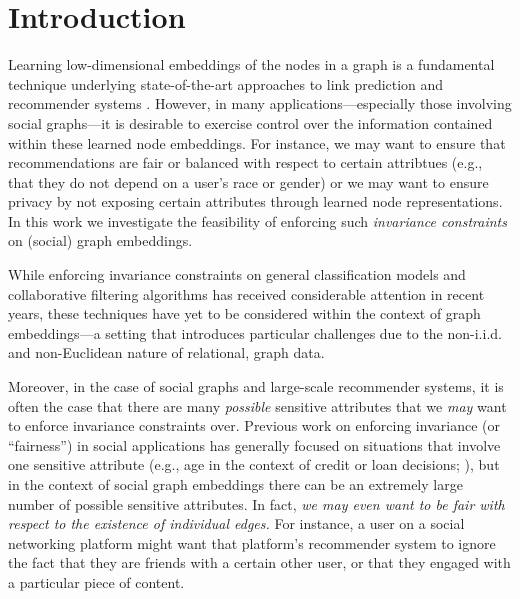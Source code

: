 \section{Introduction}
Learning low-dimensional embeddings of the nodes in a graph is a fundamental technique underlying state-of-the-art approaches to link prediction and recommender systems \cite{cai2018comprehensive,hamilton2017representation}. 
However, in many applications---especially those involving social graphs---it is desirable to exercise control over the information contained within these learned node embeddings. 
For instance, we may want to ensure that recommendations are fair or balanced with respect to certain attribtues (e.g., that they do not depend on a user's race or gender) or we may want to ensure privacy by not exposing certain attributes through learned node representations. 
In this work we investigate the feasibility of enforcing such {\em invariance constraints} on (social)  graph embeddings. 

While enforcing invariance constraints on general classification models \cite{chouldechova2017fair,gajane2017formalizing,kamishima2012fairness,madras2018learning,zemel2013learning} and collaborative filtering algorithms \cite{yao2017new} has received considerable attention in recent years, these techniques have yet to be considered within the context of graph embeddings---a setting that introduces particular challenges due to the non-i.i.d. and non-Euclidean nature of relational, graph data. 

Moreover, in the case of social graphs and large-scale recommender systems, it is often the case that there are many {\em possible} sensitive attributes that we {\em may} want to enforce invariance constraints over.
Previous work on enforcing invariance (or ``fairness'') in social applications has generally focused on situations that involve one sensitive attribute (e.g., age in the context of credit or loan decisions; \citet{zemel2013learning}), but in the context of social graph embeddings there can be an extremely large number of possible sensitive attributes. In fact, {\em we may even want to be fair with respect to the existence of individual edges.}
For instance, a user on a social networking platform might want that platform's recommender system to ignore the fact that they are friends with a certain other user, or that they engaged with a particular piece of content. 

